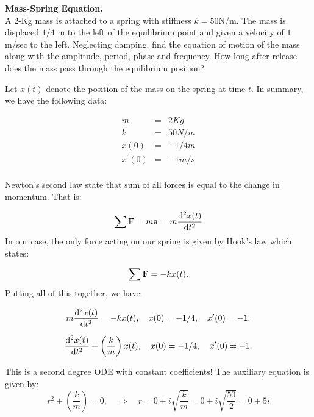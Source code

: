\documentclass[11pt]{article}
\begin{document}
\begin{problem}
\textbf{Mass-Spring Equation.} \\
A 2-Kg mass is attached to a spring with stiffness $k = 50$N/m. The mass is displaced $1/4$ m to the left of the equilibrium point and given a velocity of $1$m/sec to the left. Neglecting damping, find the equation of motion of the mass along with the amplitude, period, phase and frequency. How long after release does the mass pass through the equilibrium position?
\end{problem}
\begin{solution}
 Let $x(t)$ denote the position of the mass on the spring at time $t$. In summary, we have the following data:

\begin{eqnarray*}
m & = & 2Kg \\
k & = & 50N/m \\
x(0) & = & -1/4 m \\
x^{\prime}(0) & = & -1 m/s \\
\end{eqnarray*}

Newton's second law state that sum of all forces is equal to the change in momentum. That is:

\begin{equation*}
\sum {\bf F} = m {\bf a} = m \dfrac{{\rm d}^2 x(t)}{{\rm d} t^2}
\end{equation*}
In our case, the only force acting on our spring is given by Hook's law which states:

\begin{equation*}
\sum {\bf F} = -k x(t).
\end{equation*}
Putting all of this together, we have:

\begin{equation*}
m \dfrac{{\rm d}^2 x(t)}{{\rm d} t^2} = -k x(t), \quad x(0) = -1/4 , \quad x^{\prime}(0) = -1.
\end{equation*}

\begin{equation*}
 \dfrac{{\rm d}^2 x(t)}{{\rm d} t^2} +\left( \dfrac{k}{m} \right) x(t), \quad x(0) = -1/4 , \quad x^{\prime}(0) = -1.
\end{equation*}

This is a second degree ODE with constant coefficients! The auxiliary equation is given by:
\begin{equation*}
 r^2 +\left( \dfrac{k}{m} \right) =0, \quad \Rightarrow \quad r = 0 \pm i \sqrt{\dfrac{k}{m}} = 0 \pm i \sqrt{\dfrac{50}{2}} = 0 \pm 5 i
\end{equation*}


\end{solution}
\end{document}
